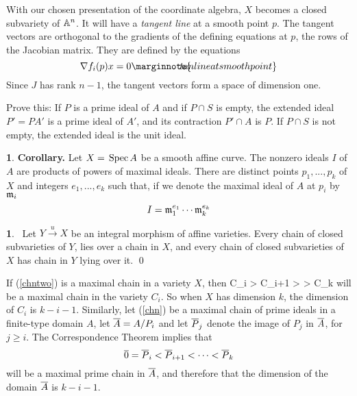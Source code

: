 \documentclass[leqno]{book}
\newcommand\Marginnote[1]{\marginnote{\hspace{-12pt}\normalfont{#1}}}
\renewcommand\theequation{\thesection.\arabic{equation}}
\newenvironment{boldequation}{\renewcommand\theequation{\textbf{\thesection.\arabic{equation}}}\equation}
   {\endequation}
\theoremstyle{definition}%
\numberwithin{equation}{section}
\theoremstyle{theorem} %
\newtheorem{proposition}[equation]{}
\newtheorem{corollary}[equation]{}
\begin{document}
\ms With our chosen presentation of the coordinate algebra, $X$
becomes a closed subvariety of $\mathbb{A}^n$.  It will have a {\it tangent
  line} at a smooth point $p$.  The tangent vectors are
orthogonal to the gradients of the defining equations at $p$, the rows
of the Jacobian matrix.  They are defined by the
equations
\begin{equation}
\nabla f_i(p) x = 0\Marginnote{tanlineatsmoothpoint}
	\label{tanlineatsmoothpoint}
\end{equation}
Since $J$ has rank $n-1$, the tangent vectors form a space of dimension one.

\ms
Prove this: If $P$ is a prime ideal of $A$ and if $P\cap S$
is empty, the extended ideal $P' = PA'$ is a prime ideal of $A'$, and
its contraction $P'\cap A$ is $P$.  If $P\cap S$ is not empty,
the extended ideal is the unit ideal.

\begin{corollary}{\bf Corollary.}
\Marginnote{idealsofA}\label{idealsofA} Let $X = \,\operatorname{Spec} A$ be a smooth
affine curve.  The nonzero ideals $I$ of $A$ are products of powers of
maximal ideals.  There are distinct points $p_1,...,p_k$ of $X$ and
integers $e_1,...,e_k$ such that, if we denote the maximal ideal of
$A$ at $p_i$ by $\mathfrak m_i$ $$I = \mathfrak m_1^{e_1}\cdots \mathfrak m_k^{e_k}$$
\end{corollary}

\begin{proposition}{}\Marginnote{chainsmax}\;\,
Let $Y \stackrel{u}{\longrightarrow} X$ be an integral morphism of affine
varieties.  Every chain of closed subvarieties of $Y$, lies over a
chain in $X$, and every chain of closed subvarieties of $X$ has chain
in $Y$ lying over it.  \qed \label{chainsmax}\end{proposition}


If (\ref{chntwo}) is a maximal chain in a variety $X$, then
\begin{boldequation}
C_i > C_{i+1} > \cdots > C_k \Marginnote{chaini}
	\label{chaini}
\end{boldequation}
 will be a maximal chain in the variety $C_i$.  So when $X$ has dimension $k$,
the dimension of $C_i$ is $k\!-\!i\!-\!1$.  Similarly, let (\ref{chn})
be a maximal chain of prime ideals in a finite-type domain $A$, let
$\overline A= A/P_i$ and let $\overline P_j$ denote the image of $P_j$ in $\overline A$, for
$j \geq i$.  The Correspondence Theorem implies that 
$$\overline{0} = \overline P_i < \overline P_{i+1} < \cdots < \overline P_k$$ will be a
maximal prime chain in $\overline A$, and therefore that the dimension of the
domain $\overline A$ is $k\!-\!i\!-\!1$.  
\end{document}
